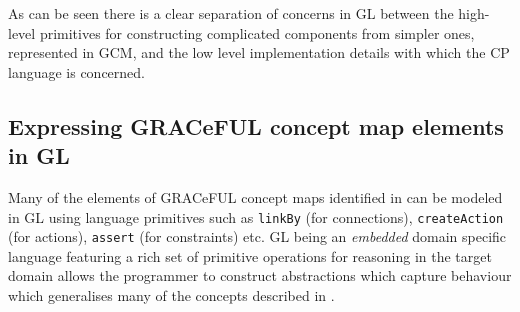 As can be seen there is a clear separation of concerns in GL between the high-level primitives
for constructing complicated components from simpler ones, represented in GCM, and the low level
implementation details with which the CP language is concerned.

\subsection{Expressing GRACeFUL concept map elements in GL}
Many of the elements of GRACeFUL concept maps identified in \cite{D4.1} can be modeled in
GL using language primitives such as \texttt{linkBy} (for connections),
\texttt{createAction} (for actions), \texttt{assert} (for constraints) etc.
GL being an \textit{embedded} domain specific language featuring a rich set of primitive
operations for reasoning in the target domain allows the programmer to construct
abstractions which capture behaviour which generalises many of the concepts described
in \cite{D4.1}.
